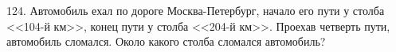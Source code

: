 124. Автомобиль ехал по дороге Москва-Петербург, начало его пути у столба <<104-й км>>, конец пути у столба <<204-й км>>. Проехав четверть пути, автомобиль сломался. Около какого столба сломался автомобиль?\\
